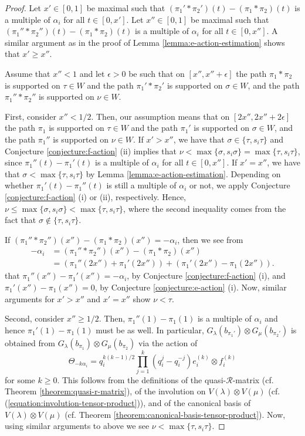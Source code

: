 \documentclass[final]{amsart}
\theoremstyle{plain}
\theoremstyle{definition}
\newcommand{\calR}{\mathcal R}
\begin{document}
\begin{proof}
    Let $x' \in [0, 1]$ be maximal such that $(\pi_1'*\pi_2')(t) - (\pi_1*\pi_2)(t)$ is a multiple of $\alpha_i$ for all $t \in [0, x']$.
    Let $x'' \in [0, 1]$ be maximal such that $(\pi_1''*\pi_2'')(t) - (\pi_1*\pi_2)(t)$ is a multiple of $\alpha_i$ for all $t \in [0, x'']$.
    A similar argument as in the proof of Lemma \ref{lemma:e-action-estimation} shows that $x' \ge x''$.

    Assume that $x'' < 1$ and let $\epsilon > 0$ be such that on $[x'', x''+\epsilon]$ the path $\pi_1*\pi_2$ is supported on $\tau \in W$ and the path $\pi_1'*\pi_2'$ is supported on $\sigma \in W$, and the path $\pi_1''*\pi_2''$ is supported on $\nu \in W$.

    First, consider $x'' < 1/2$.
    Then, our assumption means that on $[2x'', 2x'' + 2\epsilon]$ the path $\pi_1$ is supported on $\tau \in W$ and the path $\pi_1'$ is supported on $\sigma \in W$, and the path $\pi_1''$ is supported on $\nu \in W$.
    If $x' > x''$, we have that $\sigma \in \{\tau, s_i\tau\}$ and Conjecture \ref{conjecture:f-action} (ii) implies that $\nu < \max\{\sigma, s_i\sigma\} = \max\{\tau, s_i\tau\}$, since $\pi_1''(t) - \pi_1'(t)$ is a multiple of $\alpha_i$ for all $t \in [0, x'']$.
    If $x' = x''$, we have that $\sigma < \max\{\tau, s_i\tau\}$ by Lemma \ref{lemma:e-action-estimation}.
    Depending on whether $\pi_1'(t) - \pi_1''(t)$ is still a multiple of $\alpha_i$ or not, we apply Conjecture \ref{conjecture:f-action} (i) or (ii), respectively.
    Hence, $\nu \le \max\{\sigma, s_i\sigma\} < \max\{\tau, s_i\tau\}$, where the second inequality comes from the fact that $\sigma \notin \{\tau, s_i\tau\}$.

    If $(\pi_1''*\pi_2'')(x'') - (\pi_1*\pi_2)(x'') = -\alpha_i$, then we see from
    \begin{align*}
        -\alpha_i
        &= (\pi_1''*\pi_2'')(x'') - (\pi_1*\pi_2)(x'') \\
        &= (\pi_1''(2x'') + \pi_1'(2x'')) + (\pi_1'(2x'') - \pi_1(2x'')).
    \end{align*}
    that $\pi_1''(x'') - \pi_1'(x'') = -\alpha_i$, by Conjecture \ref{conjecture:f-action} (i), and $\pi_1'(x'') - \pi_1(x'') = 0$, by Conjecture \ref{conjecture:e-action} (i).
    Now, similar arguments for $x' > x''$ and $x' = x''$ show $\nu < \tau$.

    Second, consider $x'' \ge 1/2$.
    Then, $\pi_1''(1) - \pi_1(1)$ is a multiple of $\alpha_i$ and hence $\pi_1'(1) - \pi_1(1)$ must be as well.
    In particular, $G_\lambda(b_{\pi_1'}) \otimes G_\mu(b_{\pi_2'})$ is obtained from $G_\lambda(b_{\pi_1}) \otimes G_\mu(b_{\pi_2})$ via the action of
    \[
        \Theta_{-k\alpha_i} = q_i^{k(k-1)/2} \prod_{j=1}^k (q_i^j - q_i^{-j}) e_i^{(k)} \otimes f_i^{(k)}
    \]
    for some $k \ge 0$.
    This follows from the definitions of the quasi-$\calR$-matrix (cf. Theorem \ref{theorem:quasi-r-matrix}), of the involution on $V(\lambda) \otimes V(\mu)$ (cf. (\ref{equation:involution-tensor-product})), and of the canonical basis of $V(\lambda) \otimes V(\mu)$ (cf. Theorem \ref{theorem:canonical-basis-tensor-product}).
    Now, using similar arguments to above we see $\nu < \max\{\tau, s_i\tau\}$.


\end{proof}
\end{document}
